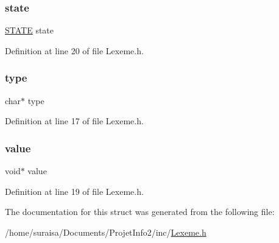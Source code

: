 \mbox{\label{struct_l_e_x_e_m_e_a390ef51e2cfd455504254347218a71ca}} 
\subsubsection{\texorpdfstring{state}{state}}
{\footnotesize\ttfamily \hyperlink{_state_machine_8h_a275a67132f10277ada3a0ee3d616b647}{S\+T\+A\+TE} state}



Definition at line 20 of file Lexeme.\+h.

\mbox{\label{struct_l_e_x_e_m_e_a23506fc4821ab6d9671f3e6222591a96}} 
\subsubsection{\texorpdfstring{type}{type}}
{\footnotesize\ttfamily char$\ast$ type}



Definition at line 17 of file Lexeme.\+h.

\mbox{\label{struct_l_e_x_e_m_e_a0f61d63b009d0880a89c843bd50d8d76}} 
\subsubsection{\texorpdfstring{value}{value}}
{\footnotesize\ttfamily void$\ast$ value}



Definition at line 19 of file Lexeme.\+h.



The documentation for this struct was generated from the following file\+:\begin{DoxyCompactItemize}
\item 
/home/suraisa/\+Documents/\+Projet\+Info2/inc/\hyperlink{_lexeme_8h}{Lexeme.\+h}\end{DoxyCompactItemize}
